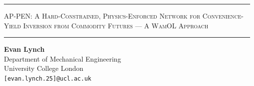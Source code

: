 \documentclass[11pt, a4paper]{article}
\makeatletter
\newcommand{\thesistitle}{%
  \vspace*{0.2cm}%
  \noindent\rule{\textwidth}{1.5pt}%
  \vspace{0.6cm}%
  \begin{center}%
    {\Large\scshape AP-PEN: A Hard-Constrained, Physics-Enforced Network for Convenience-Yield Inversion from Commodity Futures — A WamOL Approach}%
  \end{center}%
  \vspace{0.4cm}%
  \noindent\rule{\textwidth}{1.5pt}%
  \vspace{0.8cm}%
  \begin{center}%
    \textbf{Evan Lynch}\\[4pt]
    Department of Mechanical Engineering\\[2pt]
    University College London\\[2pt]
    \texttt{[evan.lynch.25]@ucl.ac.uk}%
  \end{center}%
  \vspace{0.6cm}%
}
\newcommand{\todo}[1]{\textcolor{red}{\textbf{[TODO: #1]}}}
\makeatother
\begin{document}

% 



\thesistitle
\thispagestyle{fancy}  %



\begin{abstract}
\todo{Write last. Single paragraph, max 300 words. Cover:
(1) Background: commodity markets require real-time estimation of the latent
    convenience yield; traditional Kalman filter approaches assume linearity.
(2) Method: propose the Affine-Partitioned, Physics-Enforced Network (AP-PEN) for the Gibson--Schwartz
    two-factor model. A single network parameterises the latent convenience-yield
    path delta\_hat\_phi(t); the affine term-structure coefficients A(tau) and B(tau)
    are imposed analytically in closed form rather than learned, so the pricing
    relation satisfies the futures PDE by construction. Physics enters through
    that hard constraint plus a P-measure OU transition likelihood and
    literature-grounded no-arbitrage inequality penalties, balanced by the
    WamOL gradient-norm scheme.
(3) Results: summarise key findings from synthetic and real-data experiments;
    comparison against Kalman filter and baseline models.
(4) Conclusions: state the main contribution and practical implications.}
\end{abstract}
\end{document}
